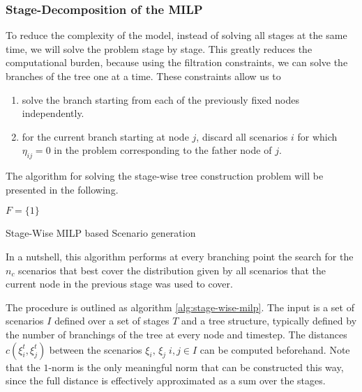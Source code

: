 \documentclass[a4paper, 12pt] {article}
\begin{document}
\subsubsection{Stage-Decomposition of the MILP}
To reduce the complexity of the model, instead of solving all stages at the same time, we will solve the problem stage by stage. This greatly reduces the computational burden, because using the filtration constraints, we can solve the branches of the tree one at a time. These constraints allow us to 
\begin{enumerate}
\item solve the branch starting from each of the previously fixed nodes independently.
\item for the current branch starting at node $j$, discard all scenarios $i$ for which $\eta_{ij}=0$ in the problem corresponding to the father node of $j$.
\end{enumerate}

The algorithm for solving the stage-wise tree construction problem will be presented in the following.
\begin{algorithm}
  $F = \{1\}$
\caption{Stage-Wise MILP based Scenario generation}
\label{alg:stage-wise-milp}
\end{algorithm}
In a nutshell, this algorithm performs at every branching point the search for the $n_c$ scenarios that best cover the distribution given by all scenarios that the current node in the previous stage was used to cover.

The procedure is outlined as algorithm \ref{alg:stage-wise-milp}. The input is a set of scenarios $I$ defined over a set of stages $T$ and a tree structure, typically defined by the number of branchings of the tree at every node and timestep. The distances $c(\xi_i^t, \xi_j^t)$ between the scenarios $\xi_i,\,\xi_j\; i,j\in I$ can be computed beforehand. Note that the $1$-norm is the only meaningful norm that can be constructed this way, since the full distance is effectively approximated as a sum over the stages.
\end{document}
